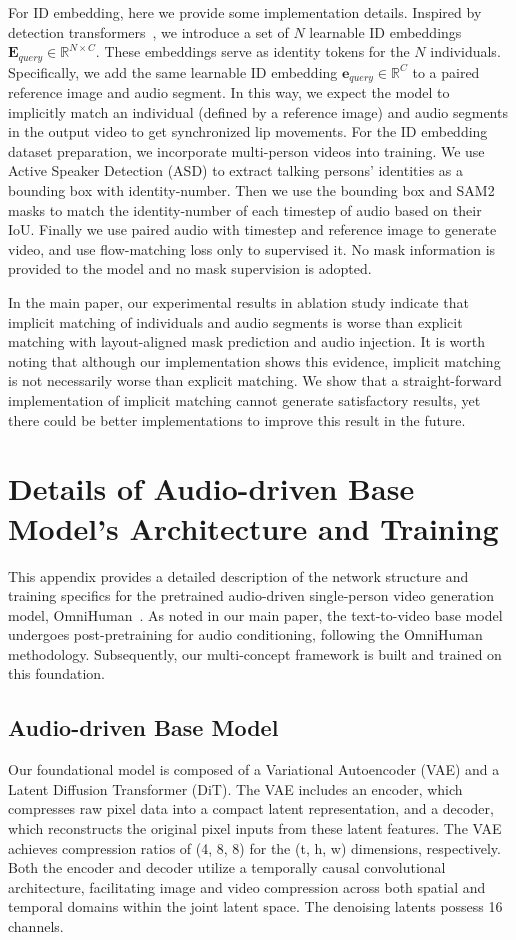 \documentclass{article} %
\begin{document}
For ID embedding, here we provide some implementation details. Inspired by detection transformers~\citep{carion2020end}, we introduce a set of $N$ learnable ID embeddings $\mathbf{E}_{query} \in \mathbb{R}^{N \times C}$. These embeddings serve as identity tokens for the $N$ individuals. Specifically, we add the same learnable ID embedding $\mathbf{e}_{query} \in \mathbb{R}^{C}$ to a paired reference image and audio segment. In this way, we expect the model to implicitly match an individual (defined by a reference image) and audio segments in the output video to get synchronized lip movements. For the ID embedding dataset preparation, we incorporate multi-person videos into training. We use Active Speaker Detection (ASD) to extract talking persons' identities as a bounding box with identity-number. Then we use the bounding box and SAM2 masks to match the identity-number of each timestep of audio based on their IoU. Finally we use paired audio with timestep and reference image to generate video, and use flow-matching loss only to supervised it. No mask information is provided to the model and no mask supervision is adopted.

In the main paper, our experimental results in ablation study indicate that implicit matching of individuals and audio segments is worse than explicit matching with layout-aligned mask prediction and audio injection. It is worth noting that although our implementation shows this evidence, implicit matching is not necessarily worse than explicit matching. We show that a straight-forward implementation of implicit matching cannot generate satisfactory results, yet there could be better implementations to improve this result in the future.

\section{Details of Audio-driven Base Model's Architecture and Training}
\label{sec:omnihuman_details}
This appendix provides a detailed description of the network structure and training specifics for the pretrained audio-driven single-person video generation model, OmniHuman~\citep{lin2025omnihuman}. As noted in our main paper, the text-to-video base model undergoes post-pretraining for audio conditioning, following the OmniHuman~\citep{lin2025omnihuman} methodology. Subsequently, our multi-concept framework is built and trained on this foundation.

\subsection{Audio-driven Base Model}
Our foundational model is composed of a Variational Autoencoder (VAE) and a Latent Diffusion Transformer (DiT). The VAE includes an encoder, which compresses raw pixel data into a compact latent representation, and a decoder, which reconstructs the original pixel inputs from these latent features. The VAE achieves compression ratios of (4, 8, 8) for the (t, h, w) dimensions, respectively. Both the encoder and decoder utilize a temporally causal convolutional architecture, facilitating image and video compression across both spatial and temporal domains within the joint latent space. The denoising latents possess 16 channels.
\end{document}
